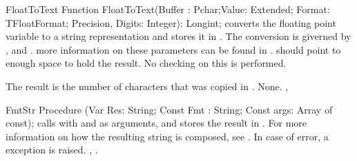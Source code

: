 

\begin{function}{FloatToText}
\Declaration
Function FloatToText(Buffer : Pchar;Value: Extended; Format: TFloatFormat; Precision, Digits: Integer): Longint;
\Description
{} converts the floating point variable  to a
string representation and stores it in .  The conversion is
giverned by ,  and .
more information on these parameters can be found in .
 should point to enough space to hold the result. No checking on
this is performed.

The result is the number of characters that was copied in .
\Errors
None.
\SeeAlso
{}, 
\end{function}



\begin{procedure}{FmtStr}
\Declaration
Procedure (Var Res: String; Const Fmt : String; Const args: Array of const);
\Description
{} calls  with  and  as arguments,
and stores the result in . For more information on how the
resulting string is composed, see .
\Errors
In case of error, a  exception is raised.
\SeeAlso
{}, .
\end{procedure}



